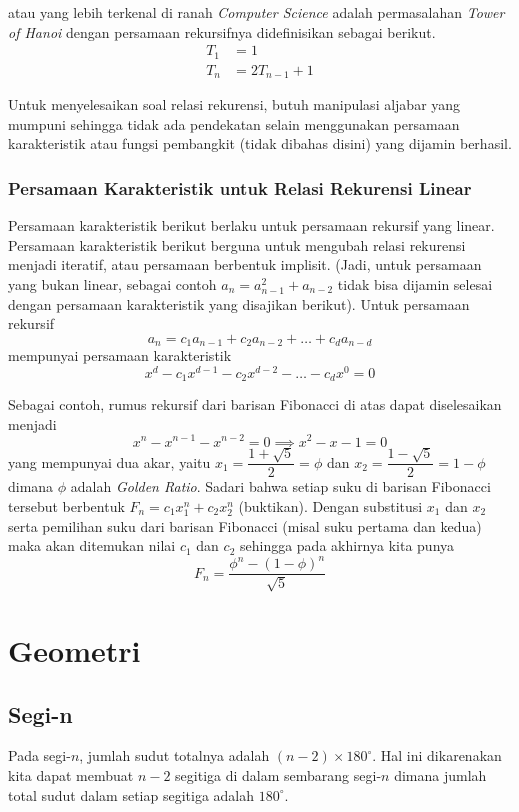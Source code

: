 \documentclass[11pt]{scrartcl}
\begin{document}
    atau yang lebih terkenal di ranah \textit{Computer Science} adalah permasalahan \textit{Tower of Hanoi} dengan persamaan rekursifnya didefinisikan sebagai berikut.
    \begin{align*}
        T_1 &= 1 \\
        T_n &= 2T_{n-1}+1
    \end{align*}
    
    Untuk menyelesaikan soal relasi rekurensi, butuh manipulasi aljabar yang mumpuni sehingga tidak ada pendekatan selain menggunakan persamaan karakteristik atau fungsi pembangkit (tidak dibahas disini) yang dijamin berhasil.
    
    \subsubsection{Persamaan Karakteristik untuk Relasi Rekurensi Linear}
    Persamaan karakteristik berikut berlaku untuk persamaan rekursif yang linear. Persamaan karakteristik berikut berguna untuk mengubah relasi rekurensi menjadi iteratif, atau persamaan berbentuk implisit. (Jadi, untuk persamaan yang bukan linear, sebagai contoh $a_n = a_{n-1}^2 + a_{n-2}$ tidak bisa dijamin selesai dengan persamaan karakteristik yang disajikan berikut).
    Untuk persamaan rekursif
    $$a_n = c_1a_{n-1}+c_2a_{n-2}+\dots+c_da_{n-d}$$
    mempunyai persamaan karakteristik
    $$x^d-c_1x^{d-1}-c_2x^{d-2}-\dots-c_dx^0=0$$
    
    Sebagai contoh, rumus rekursif dari barisan Fibonacci di atas dapat diselesaikan menjadi 
    $$x^{n}-x^{n-1}-x^{n-2}=0 \implies x^2-x-1=0$$
    yang mempunyai dua akar, yaitu $x_1 = \dfrac{1+\sqrt{5}}{2}=\phi$ dan $x_2 = \dfrac{1-\sqrt{5}}{2}=1-\phi$ dimana $\phi$ adalah \textit{Golden Ratio}. Sadari bahwa setiap suku di barisan Fibonacci tersebut berbentuk $F_n = c_1x_1^n + c_2x_2^n$ (buktikan). Dengan substitusi $x_1$ dan $x_2$ serta pemilihan suku dari barisan Fibonacci (misal suku pertama dan kedua) maka akan ditemukan nilai $c_1$ dan $c_2$ sehingga pada akhirnya kita punya
    $$F_n=\dfrac{\phi^n-(1-\phi)^n}{\sqrt{5}}$$
    
    

\section{Geometri}
    \subsection{Segi-n}
    Pada segi-$n$, jumlah sudut totalnya adalah $(n-2)\times 180^\circ$. Hal ini dikarenakan kita dapat membuat $n-2$ segitiga di dalam sembarang segi-$n$ dimana jumlah total sudut dalam setiap segitiga adalah $180^\circ$.\\
    
\end{document}
